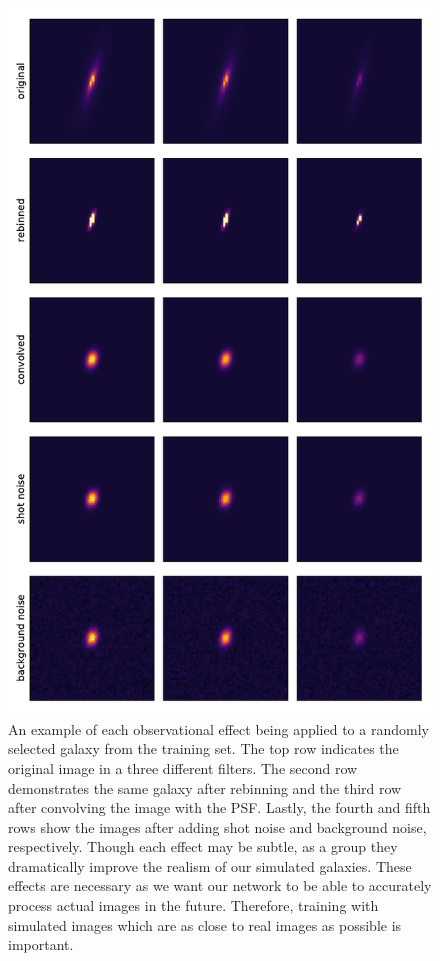 \documentclass[fleqn,usenatbib]{mnras}
\begin{document}
\begin{figure}
	\includegraphics[width=\columnwidth]{Figures/obs_eff_2.pdf}
    \caption{An example of each observational effect being applied to a randomly selected galaxy from the training set. The top row indicates the original image in a three different filters. The second row demonstrates the same galaxy after rebinning and the third row after convolving the image with the PSF. Lastly, the fourth and fifth rows show the images after adding shot noise and background noise, respectively. Though each effect may be subtle, as a group they dramatically improve the realism of our simulated galaxies. These effects are necessary as we want our network to be able to accurately process actual images in the future. Therefore, training with simulated images which are as close to real images as possible is important.}
    \label{fig:obs_eff}
\end{figure}
\end{document}
